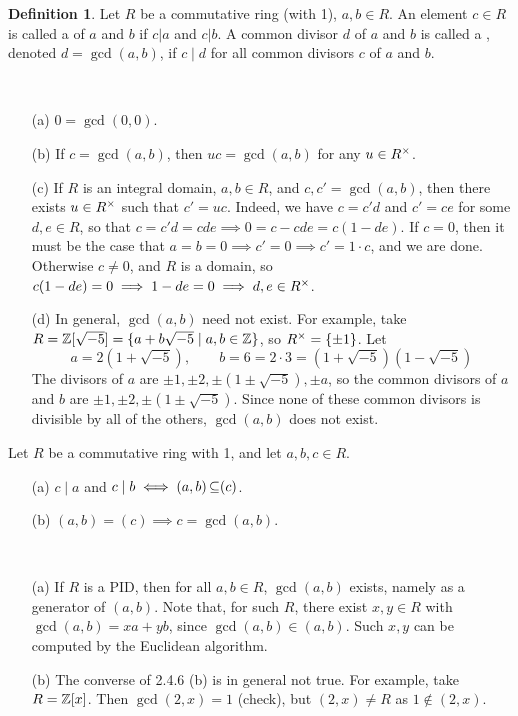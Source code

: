 \documentclass[11pt]{book}
\theoremstyle{definition}   \newtheorem{defn}[counter]{Definition} %
\newcommand{\vs}{\vspace{8pt}}
\numberwithin{counter}{chapter}
\begin{document}
\vs

\begin{defn}
Let $R$ be a commutative ring (with 1), $a,b \in R$. An element $c \in R$ is called a  of $a$ and $b$ if $c | a$ and $c | b$. A common divisor $d$ of $a$ and $b$ is called a , denoted $d = \gcd(a,b)$, if $c \mid d$ for all common divisors $c$ of $a$ and $b$.
\end{defn}

\vs

\begin{remark}
\
\begin{enumerate}
\item[(a)] $0 = \gcd(0,0)$.
\item[(b)] If $c = \gcd(a,b)$, then $uc = \gcd(a,b)$ for any $u \in R^{\times}$.
\item[(c)] If $R$ is an integral domain, $a,b \in R$, and $c,c' = \gcd(a,b)$, then there exists $u \in R^{\times}$ such that $c' = uc$. Indeed, we have $c = c'd$ and $c' = ce$ for some $d,e \in R$, so that $c = c'd = cde \implies 0 = c-cde = c(1-de)$. If $c = 0$, then it must be the case that $a=b=0 \implies c'=0 \implies c'=1 \cdot c$,  and we are done. Otherwise $c\ne 0$, and $R$ is a domain, so $c(1-de) = 0 \implies 1-de = 0 \implies d,e \in R^{\times}$.
\item[(d)] In general, $\gcd(a,b)$ need not exist. For example, take $R = \operatorname{\mathbb{Z}}[\sqrt{-5}] = \{a+b\sqrt{-5} \mid a,b \in \operatorname{\mathbb{Z}}\}$, so $R^{\times} = \{\pm 1\}$. Let
	\[a = 2(1+\sqrt{-5}), \qquad b = 6 = 2\cdot 3 = (1+\sqrt{-5})(1-\sqrt{-5}) \]
The divisors of $a$ are $\pm 1, \pm 2, \pm(1\pm \sqrt{-5}), \pm a$, so the common divisors of $a$ and $b$ are $\pm 1, \pm 2, \pm(1\pm \sqrt{-5})$. Since none of these common divisors is divisible by all of the others, $\gcd(a,b)$ does not exist.
\end{enumerate}
\end{remark}

\vs

\begin{lemma}
Let $R$ be a commutative ring with 1, and let $a,b,c \in R$.
\begin{enumerate}
\item[(a)] $c \mid a$ and $c \mid b \iff (a,b) \operatorname{\subseteq} (c)$.
\item[(b)] $(a,b) = (c) \implies c = \gcd(a,b)$.
\end{enumerate}
\end{lemma}

\vs

\begin{remark}
\
\begin{enumerate}
\item[(a)] If $R$ is a PID, then for all $a,b \in R$, $\gcd(a,b)$ exists, namely as a generator of $(a,b)$. Note that, for such $R$, there exist $x,y \in R$ with $\gcd(a,b) = xa + yb$, since $\gcd(a,b) \in (a,b)$. Such $x,y$ can be computed by the Euclidean algorithm.
\item[(b)] The converse of 2.4.6 (b) is in general not true. For example, take $R = \operatorname{\mathbb{Z}}[x]$. Then $\gcd(2,x) = 1$ (check), but $(2,x) \ne R$ as $1 \notin (2,x)$.
\end{enumerate}
\end{remark}
\end{document}
